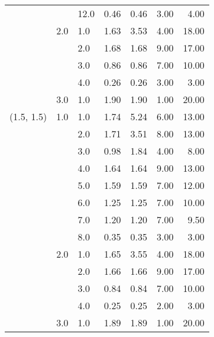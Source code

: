 \begin{tabular}{lllrrrr}
           &     & 12.0 &       0.46 &      0.46 & 3.00 &   4.00 \\
           & 2.0 & 1.0  &       1.63 &      3.53 & 4.00 &  18.00 \\
           &     & 2.0  &       1.68 &      1.68 & 9.00 &  17.00 \\
           &     & 3.0  &       0.86 &      0.86 & 7.00 &  10.00 \\
           &     & 4.0  &       0.26 &      0.26 & 3.00 &   3.00 \\
           & 3.0 & 1.0  &       1.90 &      1.90 & 1.00 &  20.00 \\
(1.5, 1.5) & 1.0 & 1.0  &       1.74 &      5.24 & 6.00 &  13.00 \\
           &     & 2.0  &       1.71 &      3.51 & 8.00 &  13.00 \\
           &     & 3.0  &       0.98 &      1.84 & 4.00 &   8.00 \\
           &     & 4.0  &       1.64 &      1.64 & 9.00 &  13.00 \\
           &     & 5.0  &       1.59 &      1.59 & 7.00 &  12.00 \\
           &     & 6.0  &       1.25 &      1.25 & 7.00 &  10.00 \\
           &     & 7.0  &       1.20 &      1.20 & 7.00 &   9.50 \\
           &     & 8.0  &       0.35 &      0.35 & 3.00 &   3.00 \\
           & 2.0 & 1.0  &       1.65 &      3.55 & 4.00 &  18.00 \\
           &     & 2.0  &       1.66 &      1.66 & 9.00 &  17.00 \\
           &     & 3.0  &       0.84 &      0.84 & 7.00 &  10.00 \\
           &     & 4.0  &       0.25 &      0.25 & 2.00 &   3.00 \\
           & 3.0 & 1.0  &       1.89 &      1.89 & 1.00 &  20.00 \\
\bottomrule
\end{tabular}
